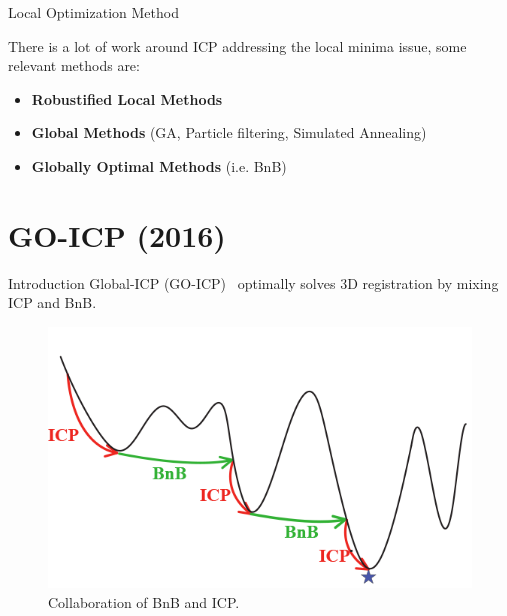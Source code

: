 \documentclass[aspectratio=1610]{beamer}
\renewcommand*{\cite}{\parencite}
\begin{document}
\begin{frame}{Local Optimization Method}

There is a lot of work around ICP addressing the local minima issue, some relevant methods are:
\begin{itemize}
	\item \textbf{Robustified Local Methods}
	\item \textbf{Global Methods} (GA, Particle filtering, Simulated Annealing)
	\item \textbf{Globally Optimal Methods} (i.e. BnB)
\end{itemize}
\end{frame}



\section{GO-ICP (2016)}
\begin{frame}{Introduction}
Global-ICP (GO-ICP)~\cite{goicp} optimally solves 3D registration by mixing ICP and BnB.
\begin{figure}[htbp]
\begin{center}
  \includegraphics[width=\textwidth,height=0.45\textheight,keepaspectratio]{imgs/GOICP_collaboration.png}
  \caption{Collaboration of BnB and ICP.}
  \label{fig:goicp_collaboration}
\end{center}
\end{figure}
\end{frame}
\end{document}
